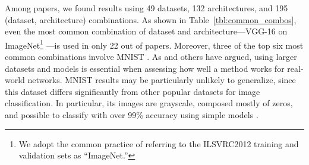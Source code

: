 


Among \npapers papers, we found results using 49 datasets, 132 architectures, and 195 (dataset, architecture) combinations. As shown in Table~\ref{tbl:common_combos}, even the most common combination of dataset and architecture---VGG-16 on ImageNet\footnote{We adopt the common practice of referring to the ILSVRC2012 training and validation sets as ``ImageNet.''} \cite{imagenet}---is used in only 22 out of \npapers papers. Moreover, three of the top six most common combinations involve MNIST \cite{mnist}. As \citet{google-state-of-sparsity} and others have argued, using larger datasets and models is essential when assessing how well a method works for real-world networks. MNIST results may be particularly unlikely to generalize, since this dataset differs significantly from other popular datasets for image classification. In particular, its images are grayscale, composed mostly of zeros, and possible to classify with over 99\% accuracy using simple models \cite{mnist-page}.




